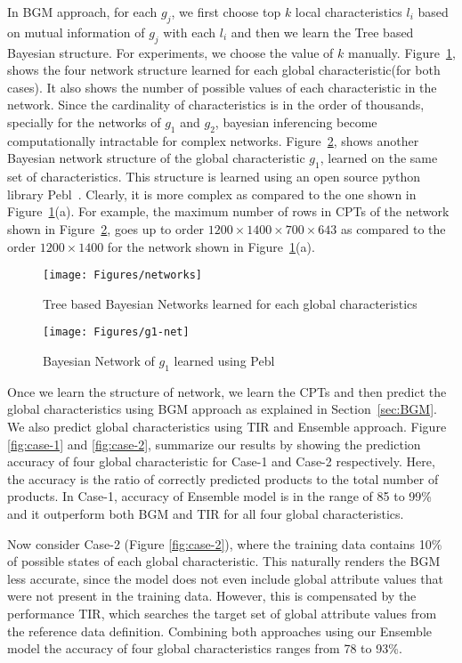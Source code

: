 In BGM approach, for each $g_j$, we first choose top $k$ local characteristics $l_i$ based on mutual information of $g_j$ with each $l_i$ and then we learn the Tree based Bayesian structure. For experiments, we choose the value of $k$ manually. Figure~\ref{fig:networks}, shows the four network structure learned for each global characteristic(for both cases). It also shows the number of possible values of each characteristic in the network. Since the cardinality of characteristics is in the order of thousands, specially for the networks of $g_1$ and $g_2$, bayesian inferencing become computationally intractable for complex networks. Figure~\ref{fig:g1net}, shows another Bayesian network structure of the global characteristic $g_1$, learned on the same set of characteristics. This structure is learned using an open source python library Pebl~\cite{shah2009python}. Clearly, it is more complex as compared to the one shown in Figure~\ref{fig:networks}(a). For example, the maximum number of rows in CPTs of the network shown in Figure~\ref{fig:g1net}, goes up to order $1200\times1400\times700\times643$ as compared to the order $1200\times1400$ for the network shown in Figure~\ref{fig:networks}(a). 
\begin{figure}
\centering
\texttt{[image: Figures/networks]}
\caption{Tree based Bayesian Networks learned for each global characteristics}
\label{fig:networks}
\end{figure}

\begin{figure}
\centering
\texttt{[image: Figures/g1-net]}
\caption{Bayesian Network of $g_1$ learned using Pebl}
\label{fig:g1net}
\end{figure}

Once we learn the structure of network, we learn the CPTs and then predict the global characteristics using BGM approach as explained in Section~\ref{sec:BGM}. We also predict global characteristics using TIR and Ensemble approach. Figure \ref{fig:case-1} and \ref{fig:case-2}, summarize our results by showing the prediction accuracy of four global characteristic for Case-1 and Case-2 respectively. Here, the accuracy is the ratio of correctly predicted products to the total number of products. In Case-1, accuracy of Ensemble model is in the range of 85 to 99\%  and it outperform both BGM and TIR for all four global characteristics. 

Now consider Case-2 (Figure \ref{fig:case-2}), where the training data contains 10\% of possible states of each global characteristic.
This naturally renders the BGM less accurate, since the model does not even include global attribute values that were not present in the
training data. However, this is compensated by the performance TIR, which searches the target set of global attribute values from the
reference data definition. Combining both approaches using our Ensemble model the accuracy of four global characteristics ranges from 78 to 93\%.

